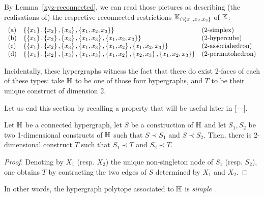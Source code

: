 By Lemma~\ref{xyz-reconnected}, we can read those pictures as describing (the realisations  of) the 
respective reconnected restrictions ${\mathbb K}_{\cap \left\{x_1,x_2,x_3\right\}}$ of ${\mathbb K}$:
$$\begin{array}{lll}
\mathrm{(a)} & \left\{\left\{x_1\right\},\left\{x_2\right\},\left\{x_3\right\},\left\{x_1,x_2,x_3\right\}\right\} & \mbox{(2-simplex)}\\
\mathrm{(b)} & \left\{\left\{x_1\right\},\left\{x_2\right\},\left\{x_3\right\},\left\{x_1,x_3\right\},\left\{x_1,x_2,x_3\right\}\right\} & \mbox{(2-hypercube})\\
\mathrm{(c)} & \left\{\left\{x_1\right\},\left\{x_2\right\},\left\{x_3\right\},\left\{x_1,x_3\right\},\left\{x_1,x_2\right\},\left\{x_1,x_2,x_3\right\}\right\} & \mbox{(2-associahedron)}\\
\mathrm{(d)} & \left\{\left\{x_1\right\},\left\{x_2\right\},\left\{x_3\right\},\left\{x_1,x_3\right\},\left\{x_1,x_2\right\},\left\{x_2,x_3\right\},\left\{x_1,x_2,x_3\right\}\right\} & \mbox{(2-permutohedron)}
\end{array}$$

\begin{rem}
    Incidentally, these  hypergraphs witness the fact that there do exist 2-faces of  each  of these types: take ${\mathbb H}$ to be one of those four hypergraphs, and $T$ to be their unique construct of dimension 2.
\end{rem}

Let us end this section by recalling a property that will be useful later in [---].

\begin{lemma} \label{simplified-a-la-Morse} 
Let ${\mathbb H}$ be a connected hypergraph, let $S$ be a construction of ${\mathbb H}$ and let $S_1,S_2$ be two 1-dimensional constructs of ${\mathbb H}$ such that $S\prec S_1$ and $S\prec S_2$. 
Then, there is 2-dimensional construct $T$ such that $S_1\prec T$ and $S_2\prec T$.
\end{lemma}
\begin{proof} 
    Denoting by $X_1$ (resp. $X_2$) the unique non-singleton node of $S_1$ (resp. $S_2$), one obtains $T$ by contracting the two edges of $S$ determined by $X_1$ and $X_2$.
\end{proof}

In other words, the hypergraph polytope associated to ${\mathbb H}$ is \emph{simple} \cite[Prop.~9.3]{DP-HP}.




